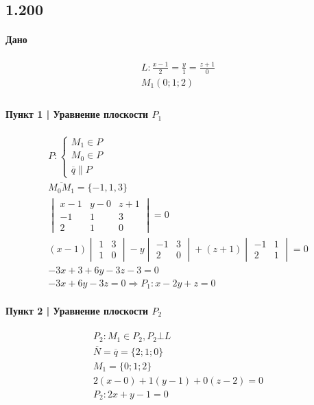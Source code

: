 \documentclass{article}
\begin{document}
\subsection{1.200}
\paragraph{Дано}
\begin{gather*}
    L: \frac{x - 1}{2} = \frac{y}{1} = \frac{z + 1}{0} \\
    M_1(0; 1; 2) \\
\end{gather*}

\paragraph{Пункт 1 | Уравнение плоскости $P_1$}
\begin{gather*}
    P: \begin{cases}
        M_1 \in P \\
        M_0 \in P \\
        \overline{q} \parallel P
    \end{cases} \\
    \overline{M_0 M_1} = \{-1, 1, 3\} \\
    \begin{vmatrix}
        x - 1 & y - 0 & z + 1 \\
           -1 &     1 &     3 \\
            2 &     1 &     0 
    \end{vmatrix} = 0 \\
    (x - 1) \begin{vmatrix}
        1 & 3 \\
        1 & 0
    \end{vmatrix} -
    y \begin{vmatrix}
        -1 & 3 \\
         2 & 0
    \end{vmatrix} +
    (z + 1) \begin{vmatrix}
        -1 & 1 \\
         2 & 1 
    \end{vmatrix} = 0 \\
    -3x + 3 + 6y - 3z - 3 = 0 \\
    -3x + 6y - 3z = 0 \Rightarrow
    P_1: x - 2y + z = 0
\end{gather*}

\paragraph{Пункт 2 | Уравнение плоскости $P_2$}
\begin{gather*}
    P_2: M_1 \in P_2, P_2 \bot L \\
    \overline{N} = \overline{q} = \{2; 1; 0\} \\
    M_1 = \{0; 1; 2\} \\
    2(x - 0) + 1(y - 1) + 0(z - 2) = 0 \\
    P_2: 2x + y - 1 = 0
\end{gather*}
\end{document}
